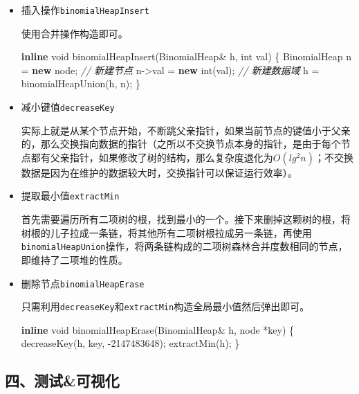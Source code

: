 \documentclass[]{article}
\newenvironment{Shaded}{}{}
\newcommand{\CommentTok}[1]{\textcolor[rgb]{0.38,0.63,0.69}{\textit{#1}}}
\newcommand{\DataTypeTok}[1]{\textcolor[rgb]{0.56,0.13,0.00}{#1}}
\newcommand{\DecValTok}[1]{\textcolor[rgb]{0.25,0.63,0.44}{#1}}
\newcommand{\KeywordTok}[1]{\textcolor[rgb]{0.00,0.44,0.13}{\textbf{#1}}}
\newcommand{\NormalTok}[1]{#1}
\begin{document}
\begin{itemize}
\item
  插入操作\texttt{binomialHeapInsert}

  使用合并操作构造即可。

\begin{Shaded}
\begin{Highlighting}[]
\KeywordTok{inline} \DataTypeTok{void}\NormalTok{ binomialHeapInsert(BinomialHeap& h, }\DataTypeTok{int}\NormalTok{ val) \{}
\NormalTok{    BinomialHeap n = }\KeywordTok{new}\NormalTok{ node; }\CommentTok{// 新建节点}
\NormalTok{    n->val = }\KeywordTok{new} \DataTypeTok{int}\NormalTok{(val); }\CommentTok{// 新建数据域}
\NormalTok{    h = binomialHeapUnion(h, n);}
\NormalTok{\}}
\end{Highlighting}
\end{Shaded}
\item
  减小键值\texttt{decreaseKey}

  实际上就是从某个节点开始，不断跳父亲指针，如果当前节点的键值小于父亲的，那么交换指向数据的指针（之所以不交换节点本身的指针，是由于每个节点都有父亲指针，如果修改了树的结构，那么复杂度退化为\(O(lg^2n)\)；不交换数据是因为在维护的数据较大时，交换指针可以保证运行效率）。
\item
  提取最小值\texttt{extractMin}

  首先需要遍历所有二项树的根，找到最小的一个。接下来删掉这颗树的根，将树根的儿子拉成一条链，将其他所有二项树根拉成另一条链，再使用\texttt{binomialHeapUnion}操作，将两条链构成的二项树森林合并度数相同的节点，即维持了二项堆的性质。
\item
  删除节点\texttt{binomialHeapErase}

  只需利用\texttt{decreaseKey}和\texttt{extractMin}构造全局最小值然后弹出即可。

\begin{Shaded}
\begin{Highlighting}[]
\KeywordTok{inline} \DataTypeTok{void}\NormalTok{ binomialHeapErase(BinomialHeap& h, node *key) \{}
\NormalTok{    decreaseKey(h, key, }\DecValTok{-2147483648}\NormalTok{);}
\NormalTok{    extractMin(h);}
\NormalTok{\}}
\end{Highlighting}
\end{Shaded}
\end{itemize}

\hypertarget{header-n21}{%
\subsection{四、测试\&可视化}\label{header-n21}}
\end{document}
